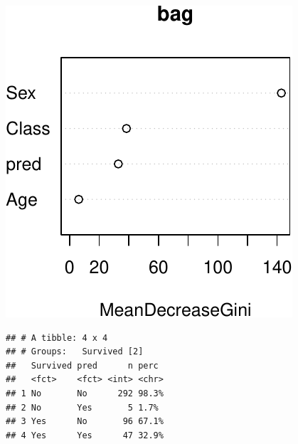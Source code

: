 \documentclass[]{article}
\newenvironment{Shaded}{\begin{snugshade}}{\end{snugshade}}
\newcommand{\DataTypeTok}[1]{\textcolor[rgb]{0.13,0.29,0.53}{#1}}
\newcommand{\KeywordTok}[1]{\textcolor[rgb]{0.13,0.29,0.53}{\textbf{#1}}}
\newcommand{\NormalTok}[1]{#1}
\newcommand{\OperatorTok}[1]{\textcolor[rgb]{0.81,0.36,0.00}{\textbf{#1}}}
\newcommand{\StringTok}[1]{\textcolor[rgb]{0.31,0.60,0.02}{#1}}
\begin{document}
\begin{center}\includegraphics{sol_A4_files/figure-latex/unnamed-chunk-26-1} \end{center}

\begin{Shaded}
\end{Shaded}

\begin{verbatim}
## # A tibble: 4 x 4
## # Groups:   Survived [2]
##   Survived pred      n perc 
##   <fct>    <fct> <int> <chr>
## 1 No       No      292 98.3%
## 2 No       Yes       5 1.7% 
## 3 Yes      No       96 67.1%
## 4 Yes      Yes      47 32.9%
\end{verbatim}
\end{document}

